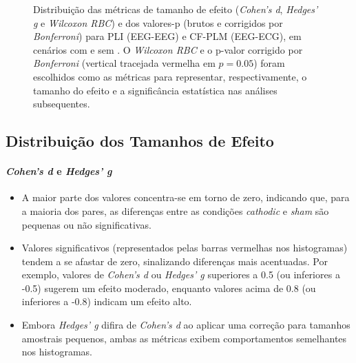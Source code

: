 \begin{figure}[htb]
{    }
    \caption[Distribuições de tamanhos de efeito e valores-p]{Distribuição das métricas de tamanho de efeito (\textit{Cohen's d}, \textit{Hedges' g} e \textit{Wilcoxon RBC}) e dos valores-p (brutos e corrigidos por \textit{Bonferroni}) para PLI (EEG-EEG) e CF-PLM (EEG-ECG), em cenários com e sem . O \textit{Wilcoxon RBC} e o p-valor corrigido por \textit{Bonferroni} (vertical tracejada vermelha em $p=0.05$) foram escolhidos como as métricas para representar, respectivamente, o tamanho do efeito e a significância estatística nas análises subsequentes.}
    \label{fig:effectsizehist_all}    
\end{figure}

\subsection{Distribuição dos Tamanhos de Efeito}
\paragraph{\textit{Cohen's d} e \textit{Hedges' g}}
\begin{itemize}
    \item A maior parte dos valores concentra-se em torno de zero, indicando que, para a maioria dos pares, as diferenças entre as condições \textit{cathodic} e \textit{sham} são pequenas ou não significativas.
    \item Valores significativos (representados pelas barras vermelhas nos histogramas) tendem a se afastar de zero, sinalizando diferenças mais acentuadas. Por exemplo, valores de \textit{Cohen's d} ou \textit{Hedges' g} superiores a 0.5 (ou inferiores a -0.5) sugerem um efeito moderado, enquanto valores acima de 0.8 (ou inferiores a -0.8) indicam um efeito alto.
    \item Embora \textit{Hedges' g} difira de \textit{Cohen's d} ao aplicar uma correção para tamanhos amostrais pequenos, ambas as métricas exibem comportamentos semelhantes nos histogramas.
\end{itemize}

